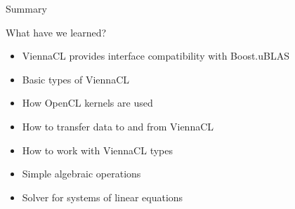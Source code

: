 \begin{frame}{Summary}
\begin{block}{What have we learned?}
  \begin{itemize}
   \item ViennaCL provides interface compatibility with Boost.uBLAS
   \item Basic types of ViennaCL
   \item How OpenCL kernels are used
   \item How to transfer data to and from ViennaCL
   \item How to work with ViennaCL types
   \item Simple algebraic operations
   \item Solver for systems of linear equations
  \end{itemize}
\end{block}
\end{frame}



% 
% 
